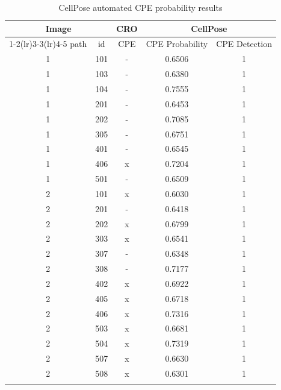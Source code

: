 \begin{table}[htbp]
\centering
\small
\setlength{\tabcolsep}{8pt}
\caption{CellPose automated CPE probability results}
\label{tab:cellpose-results}

\begin{tabular}{ccccc}
\toprule
\multicolumn{2}{c}{\textbf{Image}}
& \textbf{CRO}
& \multicolumn{2}{c}{\textbf{CellPose}} \\
\cmidrule(lr){1-2}\cmidrule(lr){3-3}\cmidrule(lr){4-5}
path & id & CPE & CPE Probability & CPE Detection \\
\midrule
\arrayrulecolor{gray!30}
1 & 101 & - & 0.6506 & 1 \\
\hline
1 & 103 & - & 0.6380 & 1 \\
\hline
1 & 104 & - & 0.7555 & 1 \\
\hline
1 & 201 & - & 0.6453 & 1 \\
\hline
1 & 202 & - & 0.7085 & 1 \\
\hline
1 & 305 & - & 0.6751 & 1 \\
\hline
1 & 401 & - & 0.6545 & 1 \\
\hline
1 & 406 & x & 0.7204 & 1 \\
\hline
1 & 501 & - & 0.6509 & 1 \\
\hline
2 & 101 & x & 0.6030 & 1 \\
\hline
2 & 201 & - & 0.6418 & 1 \\
\hline
2 & 202 & x & 0.6799 & 1 \\
\hline
2 & 303 & x & 0.6541 & 1 \\
\hline
2 & 307 & - & 0.6348 & 1 \\
\hline
2 & 308 & - & 0.7177 & 1 \\
\hline
2 & 402 & x & 0.6922 & 1 \\
\hline
2 & 405 & x & 0.6718 & 1 \\
\hline
2 & 406 & x & 0.7316 & 1 \\
\hline
2 & 503 & x & 0.6681 & 1 \\
\hline
2 & 504 & x & 0.7319 & 1 \\
\hline
2 & 507 & x & 0.6630 & 1 \\
\hline
2 & 508 & x & 0.6301 & 1 \\
\arrayrulecolor{black}
\bottomrule
\end{tabular}

\end{table}